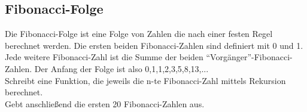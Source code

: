 \subsection{Fibonacci-Folge }
Die Fibonacci-Folge ist eine Folge von Zahlen die nach einer festen Regel berechnet werden.
Die ersten beiden Fibonacci-Zahlen sind definiert mit 0 und 1. Jede weitere Fibonacci-Zahl
ist die Summe der beiden "`Vorgänger"'-Fibonacci-Zahlen. Der Anfang der Folge ist also 0,1,1,2,3,5,8,13,...\\
Schreibt eine Funktion, die jeweils die n-te Fibonacci-Zahl mittels Rekursion berechnet.\\
Gebt anschließend die ersten 20 Fibonacci-Zahlen aus.

